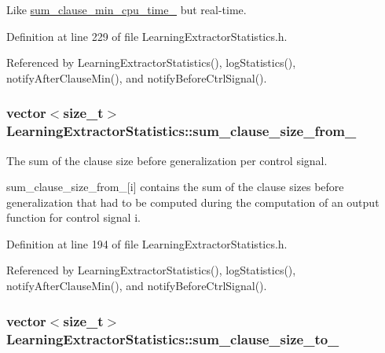Like \hyperlink{classLearningExtractorStatistics_a61118ceb2f3bd2072ce584971fb37ae2}{sum\-\_\-clause\-\_\-min\-\_\-cpu\-\_\-time\-\_\-} but real-\/time. 



Definition at line 229 of file Learning\-Extractor\-Statistics.\-h.



Referenced by Learning\-Extractor\-Statistics(), log\-Statistics(), notify\-After\-Clause\-Min(), and notify\-Before\-Ctrl\-Signal().

\hypertarget{classLearningExtractorStatistics_a2a7ac5da4b46b9366430f6934579ade7}{
\subsubsection[{sum\-\_\-clause\-\_\-size\-\_\-from\-\_\-}]{\setlength{\rightskip}{0pt plus 5cm}vector$<$size\-\_\-t$>$ Learning\-Extractor\-Statistics\-::sum\-\_\-clause\-\_\-size\-\_\-from\-\_\-\hspace{0.3cm}{\ttfamily [protected]}}}\label{classLearningExtractorStatistics_a2a7ac5da4b46b9366430f6934579ade7}


The sum of the clause size before generalization per control signal. 

sum\-\_\-clause\-\_\-size\-\_\-from\-\_\-\mbox{[}i\mbox{]} contains the sum of the clause sizes before generalization that had to be computed during the computation of an output function for control signal i. 

Definition at line 194 of file Learning\-Extractor\-Statistics.\-h.



Referenced by Learning\-Extractor\-Statistics(), log\-Statistics(), notify\-After\-Clause\-Min(), and notify\-Before\-Ctrl\-Signal().

\hypertarget{classLearningExtractorStatistics_ac503db6146780edd0fd6316777d251cf}{
\subsubsection[{sum\-\_\-clause\-\_\-size\-\_\-to\-\_\-}]{\setlength{\rightskip}{0pt plus 5cm}vector$<$size\-\_\-t$>$ Learning\-Extractor\-Statistics\-::sum\-\_\-clause\-\_\-size\-\_\-to\-\_\-\hspace{0.3cm}{\ttfamily [protected]}}}\label{classLearningExtractorStatistics_ac503db6146780edd0fd6316777d251cf}


